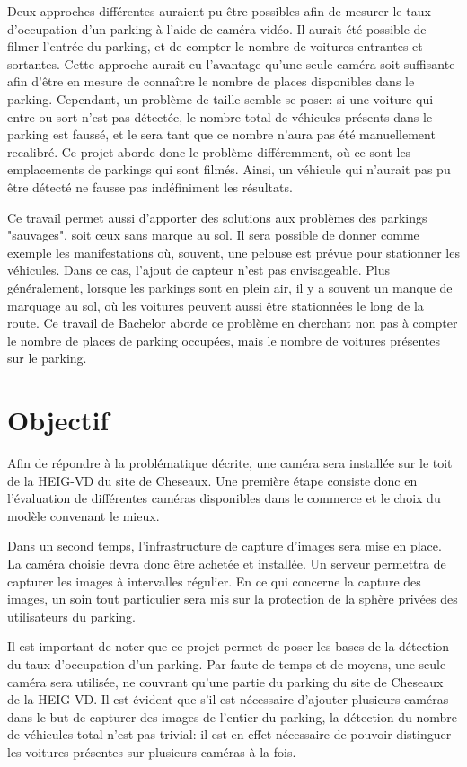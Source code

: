 Deux approches différentes auraient pu être possibles afin de mesurer le taux d'occupation d'un parking à l'aide de caméra vidéo. Il aurait été possible de filmer l'entrée du parking, et de compter le nombre de voitures entrantes et sortantes. Cette approche aurait eu l'avantage qu'une seule caméra soit suffisante afin d'être en mesure de connaître le nombre de places disponibles dans le parking. Cependant, un problème de taille semble se poser: si une voiture qui entre ou sort n'est pas détectée, le nombre total de véhicules présents dans le parking est faussé, et le sera tant que ce nombre n'aura pas été manuellement recalibré. Ce projet aborde donc le problème différemment, où ce sont les emplacements de parkings qui sont filmés. Ainsi, un véhicule qui n'aurait pas pu être détecté ne fausse pas indéfiniment les résultats.

Ce travail permet aussi d'apporter des solutions aux problèmes des parkings "sauvages", soit ceux sans marque au sol. Il sera possible de donner comme exemple les manifestations où, souvent, une pelouse est prévue pour stationner les véhicules. Dans ce cas, l'ajout de capteur n'est pas envisageable. Plus généralement, lorsque les parkings sont en plein air, il y a souvent un manque de marquage au sol, où les voitures peuvent aussi être stationnées le long de la route. Ce travail de Bachelor aborde ce problème en cherchant non pas à compter le nombre de places de parking occupées, mais le nombre de voitures présentes sur le parking. 

\section{Objectif}
Afin de répondre à la problématique décrite, une caméra sera installée sur le toit de la HEIG-VD du site de Cheseaux. Une première étape consiste donc en l'évaluation de différentes caméras disponibles dans le commerce et le choix du modèle convenant le mieux. 

Dans un second temps, l'infrastructure de capture d'images sera mise en place. La caméra choisie devra donc être achetée et installée. Un serveur permettra de capturer les images à intervalles régulier. En ce qui concerne la capture des images, un soin tout particulier sera mis sur la protection de la sphère privées des utilisateurs du parking.

Il est important de noter que ce projet permet de poser les bases de la détection du taux d'occupation d'un parking. Par faute de temps et de moyens, une seule caméra sera utilisée, ne couvrant qu'une partie du parking du site de Cheseaux de la HEIG-VD. Il est évident que s'il est nécessaire d'ajouter plusieurs caméras dans le but de capturer des images de l'entier du parking, la détection du nombre de véhicules total n'est pas trivial: il est en effet nécessaire de pouvoir distinguer les voitures présentes sur plusieurs caméras à la fois. 

